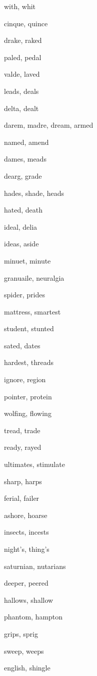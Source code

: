     \item with, whit
    \item cinque, quince
    \item drake, raked
    \item paled, pedal
    \item valde, laved
    \item leads, deals
    \item delta, dealt
    \item darem, madre, dream, armed
    \item named, amend
    \item dames, meads
    \item dearg, grade
    \item hades, shade, heads
    \item hated, death
    \item ideal, delia
    \item ideas, aside
    \item minuet, minute
    \item granuaile, neuralgia
    \item spider, prides
    \item mattress, smartest
    \item student, stunted
    \item sated, dates
    \item hardest, threads
    \item ignore, region
    \item pointer, protein
    \item wolfing, flowing
    \item tread, trade
    \item ready, rayed
    \item ultimates, stimulate
    \item sharp, harps
    \item ferial, failer
    \item ashore, hoarse
    \item insects, incests
    \item night's, thing's
    \item saturnian, nutarians
    \item deeper, peered
    \item hallows, shallow
    \item phantom, hampton
    \item grips, sprig
    \item sweep, weeps
    \item english, shingle
